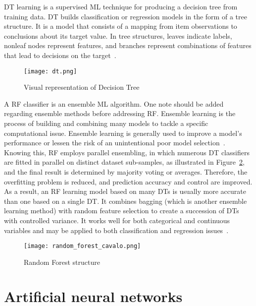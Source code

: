 \gls{DT} learning is a supervised \gls{ML} technique for producing a decision tree from training data. \gls{DT} builds classification or regression models in the form of a tree structure. It is a model that consists of a mapping from item observations to conclusions about its target value. In tree structures, leaves indicate labels, nonleaf nodes represent features, and branches represent combinations of features that lead to decisions on the target~\cite{Tan2015CodeQuality}.

\begin{figure}[htbp]
    \centering
    \texttt{[image: dt.png]}
    \caption{Visual representation of Decision Tree~\cite{Rai2018XGBoostScience}}
    \label{fig:dt}
\end{figure}

A \gls{RF} classifier is an ensemble \gls{ML} algorithm. One note should be added regarding ensemble methods before addressing \gls{RF}. Ensemble learning is the process of building and combining many models to tackle a specific computational issue. Ensemble learning is generally used to improve a model's performance or lessen the risk of an unintentional poor model selection~\cite{Mahesh2019MachineReview}. Knowing this, \gls{RF} employs parallel ensembling, in which numerous \gls{DT} classifiers are fitted in parallel on distinct dataset sub-samples, as illustrated in Figure~\ref{fig:random_forest2}, and the final result is determined by majority voting or averages. Therefore, the overfitting problem is reduced, and prediction accuracy and control are improved. As a result, an \gls{RF} learning model based on many \gls{DT}s is usually more accurate than one based on a single \gls{DT}. It combines bagging (which is another ensemble learning method) with random feature selection to create a succession of \gls{DT}s with controlled variance. It works well for both categorical and continuous variables and may be applied to both classification and regression issues~\cite{Sarker2021MachineDirections}.

\begin{figure}[htbp]
    \centering
    \texttt{[image: random\_forest\_cavalo.png]}
    \caption{Random Forest structure~\cite{Sarker2021MachineDirections}}
    \label{fig:random_forest2}
\end{figure}

\section{Artificial neural networks}\label{sec:ann}


